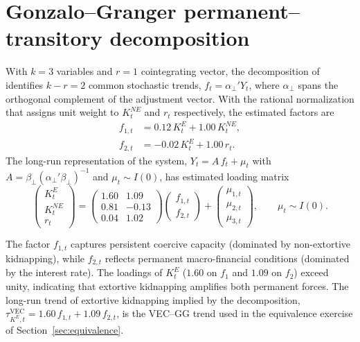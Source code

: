 \documentclass[ecta,nameyear,final,supplement]{econsocart}
\numberwithin{equation}{section}
\numberwithin{table}{section}
\theoremstyle{definition}
\newcommand{\KE}{K^{E}}
\newcommand{\KNE}{K^{NE}}
\begin{document}
\section{Gonzalo--Granger permanent--transitory decomposition}
\label{sec:gg}

With $k=3$ variables and $r=1$ cointegrating vector, the decomposition of
\citet{GonzaloGranger1995} identifies $k-r=2$ common stochastic trends,
$f_t = \alpha_\perp' Y_t$, where $\alpha_\perp$ spans the orthogonal
complement of the adjustment vector. With the rational normalization that
assigns unit weight to $\KNE_t$ and $r_t$ respectively, the estimated
factors are
\begin{align}
f_{1,t} &= 0.12\,\KE_t + 1.00\,\KNE_t ,
\label{eq:gg-f1}\\
f_{2,t} &= -0.02\,\KE_t + 1.00\,r_t .
\label{eq:gg-f2}
\end{align}
The long-run representation of the system,
$Y_t = A\,f_t + \mu_t$ with $A = \beta_\perp(\alpha_\perp'\beta_\perp)^{-1}$
and $\mu_t \sim I(0)$, has estimated loading matrix
\begin{equation}
\begin{pmatrix} \KE_t \\[2pt] \KNE_t \\[2pt] r_t \end{pmatrix}
=
\begin{pmatrix}
1.60 & 1.09 \\
0.81 & -0.13 \\
0.04 & 1.02
\end{pmatrix}
\begin{pmatrix} f_{1,t} \\[2pt] f_{2,t} \end{pmatrix}
+
\begin{pmatrix} \mu_{1,t} \\[2pt] \mu_{2,t} \\[2pt] \mu_{3,t} \end{pmatrix},
\qquad \mu_t \sim I(0).
\label{eq:gg-loading}
\end{equation}

The factor $f_{1,t}$ captures persistent coercive capacity (dominated by
non-extortive kidnapping), while $f_{2,t}$ reflects permanent macro-financial
conditions (dominated by the interest rate). The loadings of $\KE_t$
($1.60$ on $f_1$ and $1.09$ on $f_2$) exceed unity, indicating that
extortive kidnapping amplifies both permanent forces. The long-run trend of
extortive kidnapping implied by the decomposition,
$\tau^{\mathrm{VEC}}_{\KE,t} = 1.60\,f_{1,t} + 1.09\,f_{2,t}$, is the
VEC--GG trend used in the equivalence exercise of
Section~\ref{sec:equivalence}.
\end{document}

